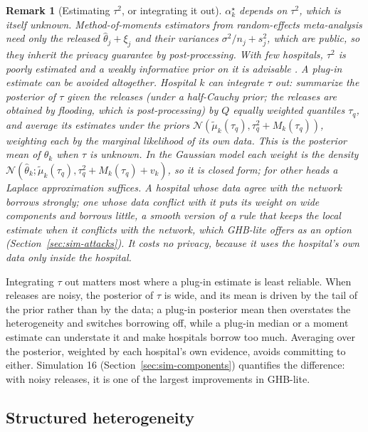 \documentclass[acmsmall,screen,review]{acmart}
\theoremstyle{acmdefinition}
\newtheorem{remark}[theorem]{Remark}}
\begin{document}
\begin{remark}[Estimating $\tau^2$, or integrating it out]\label{rem:tau}
$\alpha_k^{\star}$ depends on $\tau^2$, which is itself unknown. Method-of-moments estimators from random-effects meta-analysis \cite{dersimonian1986meta} need only the released $\hat{\theta}_j+\xi_j$ and their variances $\sigma^2/n_j+s_j^2$, which are public, so they inherit the privacy guarantee by post-processing. With few hospitals, $\tau^2$ is poorly estimated and a weakly informative prior on it is advisable \cite{gelman2013bayesian}. A plug-in estimate can be avoided altogether. Hospital $k$ can integrate $\tau$ out: summarize the posterior of $\tau$ given the releases (under a half-Cauchy prior; the releases are obtained by flooding, which is post-processing) by $Q$ equally weighted quantiles $\tau_q$, and average its estimates under the priors $\mathcal{N}(\tilde{\mu}_k(\tau_q),\tau_q^2+M_k(\tau_q))$, weighting each by the marginal likelihood of its own data. This is the posterior mean of $\theta_k$ when $\tau$ is unknown. In the Gaussian model each weight is the density $\mathcal{N}(\hat{\theta}_k;\tilde{\mu}_k(\tau_q),\tau_q^2+M_k(\tau_q)+v_k)$, so it is closed form; for other heads a Laplace approximation suffices. A hospital whose data agree with the network borrows strongly; one whose data conflict with it puts its weight on wide components and borrows little, a smooth version of a rule that keeps the local estimate when it conflicts with the network, which GHB-lite offers as an option (Section~\ref{sec:sim-attacks}). It costs no privacy, because it uses the hospital's own data only inside the hospital.
\end{remark}

Integrating $\tau$ out matters most where a plug-in estimate is least reliable. When releases are noisy, the posterior of $\tau$ is wide, and its mean is driven by the tail of the prior rather than by the data; a plug-in posterior mean then overstates the heterogeneity and switches borrowing off, while a plug-in median or a moment estimate can understate it and make hospitals borrow too much. Averaging over the posterior, weighted by each hospital's own evidence, avoids committing to either. Simulation 16 (Section~\ref{sec:sim-components}) quantifies the difference: with noisy releases, it is one of the largest improvements in GHB-lite.

\subsection{Structured heterogeneity}\label{sec:structured}
\end{document}
